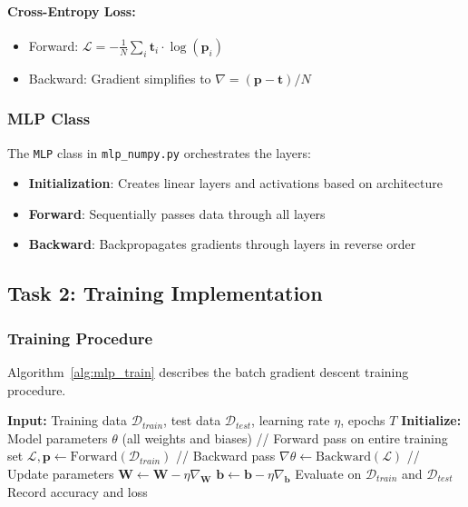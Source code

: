 \documentclass[11pt,a4paper]{article}
\begin{document}
\paragraph{Cross-Entropy Loss:}
\begin{itemize}
    \item Forward: $\mathcal{L} = -\frac{1}{N}\sum_{i} \mathbf{t}_i \cdot \log(\mathbf{p}_i)$
    \item Backward: Gradient simplifies to $\nabla = (\mathbf{p} - \mathbf{t})/N$
\end{itemize}

\subsubsection{MLP Class}
The \texttt{MLP} class in \texttt{mlp\_numpy.py} orchestrates the layers:
\begin{itemize}
    \item \textbf{Initialization}: Creates linear layers and activations based on architecture
    \item \textbf{Forward}: Sequentially passes data through all layers
    \item \textbf{Backward}: Backpropagates gradients through layers in reverse order
\end{itemize}

\subsection{Task 2: Training Implementation}

\subsubsection{Training Procedure}
Algorithm~\ref{alg:mlp_train} describes the batch gradient descent training procedure.

\begin{algorithm}
\caption{MLP Training with Batch Gradient Descent}
\label{alg:mlp_train}
\begin{algorithmic}[1]
\State \textbf{Input:} Training data $\mathcal{D}_{train}$, test data $\mathcal{D}_{test}$, learning rate $\eta$, epochs $T$
\State \textbf{Initialize:} Model parameters $\theta$ (all weights and biases)
    \State // Forward pass on entire training set
    \State $\mathcal{L}, \mathbf{p} \leftarrow \text{Forward}(\mathcal{D}_{train})$
    \State // Backward pass
    \State $\nabla\theta \leftarrow \text{Backward}(\mathcal{L})$
    \State // Update parameters
        \State $\mathbf{W} \leftarrow \mathbf{W} - \eta \nabla_{\mathbf{W}}$
        \State $\mathbf{b} \leftarrow \mathbf{b} - \eta \nabla_{\mathbf{b}}$
    \EndFor
        \State Evaluate on $\mathcal{D}_{train}$ and $\mathcal{D}_{test}$
        \State Record accuracy and loss
    \EndIf
\EndFor
\end{algorithmic}
\end{algorithm}
\end{document}

